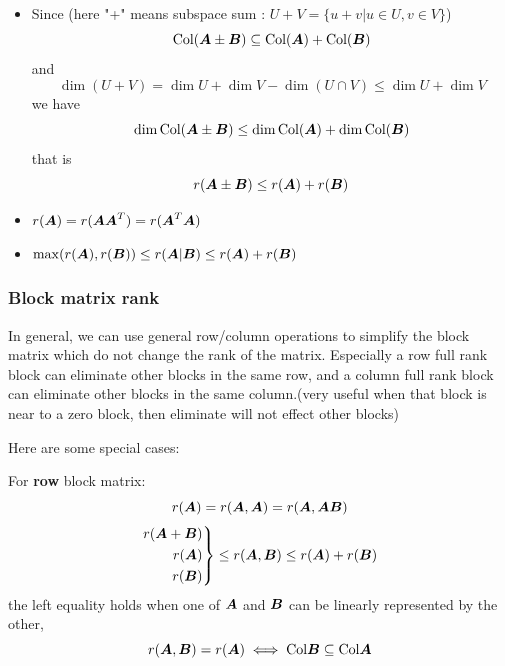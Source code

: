 \documentclass{overview}
\begin{document}
\begin{itemize}
\[\begin{tikzpicture}
\begin{scope}[xshift=3cm]
			\draw[fill=gray!15, draw=gray!70, thick, rotate=45] (0, 0) rectangle (-1.8,-3);
		\node[labelStyle, rotate=-45] at (1, -1) {Nul $(\A\B)^{T}$};
		\end{scope}

    \draw[earrowStyle,  bend left=20] (-.5, 2) to (3.5, 1.7);
\end{tikzpicture}
\]
\[
		r(\A\B)= \dim \boldsymbol{\Xi} = r(\B) - \dim\boldsymbol{\Phi}
					 \geq r(\B) - \dim \text{Nul}\A
\] 
	gives
	\begin{equation}
		r(\A\B) \geq r(\A) + r(\B) - n
	\end{equation}
	 also gives a direct inference
	 \begin{equation}
	 		\A\B=\boldsymbol{O} \Rightarrow r(\A)+r(\B) \leq n
			\label{eq:ABeqORK}
	 \end{equation}
	\item Since (here "+" means subspace sum : $U+V=\{u+v|u\in U, v\in V\}$)
		\[
			\text{Col}(\boldsymbol{A}\pm\boldsymbol{B}) \subseteq \text{Col}(\boldsymbol{A}) + \text{Col}(\boldsymbol{B})
		\] 
		and
		\[
			\dim(U+V) = \dim U + \dim V - \dim(U \cap V)
			\leq \dim U + \dim V
		\] 
		we have
		\[
			\dim \text{Col}(\boldsymbol{A}\pm\boldsymbol{B}) \leq
			\dim \text{Col}(\boldsymbol{A}) + \dim \text{Col}(\boldsymbol{B})
		\] 
		that is
		\begin{equation}
		r(\boldsymbol{A}\pm\boldsymbol{B}) \leq r(\boldsymbol{A}) + r(\boldsymbol{B})
		\label{eq:rkOfSumLeqSumOfRk}
		\end{equation}
	\item $r(\boldsymbol{A}) = r(\boldsymbol{A}\boldsymbol{A}^T) = r(\boldsymbol{A}^T\boldsymbol{A})$
	\item $\max(r(\boldsymbol{A}), r(\boldsymbol{B})) \leq
		r(\boldsymbol{A} | \boldsymbol{B}) \leq 
		r(\boldsymbol{A}) + r(\boldsymbol{B})$
\end{itemize}
\subsubsection{Block matrix rank}

In general, we can use general row/column operations to simplify the block matrix
which do not change the rank of the matrix. Especially a row full rank block
can eliminate other blocks in the same row, and a column full rank block
can eliminate other blocks in the same column.(very useful when that block is
near to a zero block, then eliminate will not effect other blocks)

Here are some special cases:

For \textbf{row} block matrix:
\[r(\boldsymbol{A})=r(\boldsymbol{A} , \boldsymbol{A}) = r(\boldsymbol{A} , \boldsymbol{A}\boldsymbol{B})\]
\[
	\left.\begin{aligned}
			r(\boldsymbol{A}+\boldsymbol{B})\\ r(\boldsymbol{A}) \\ r(\boldsymbol{B})
	\end{aligned}\right\} 
	\leq r(\boldsymbol{A} , \boldsymbol{B}) \leq r(\boldsymbol{A})+r(\boldsymbol{B})
\] 
the left equality holds when one of $\boldsymbol{A}$ and $\boldsymbol{B}$ can be linearly represented by the other,
\begin{equation}
	r(\boldsymbol{A} , \boldsymbol{B}) = r(\boldsymbol{A}) \iff \text{Col}\boldsymbol{B} \subseteq \text{Col}\boldsymbol{A}
	\label{eq:sameRkSubCol}
\end{equation}
\end{document}

